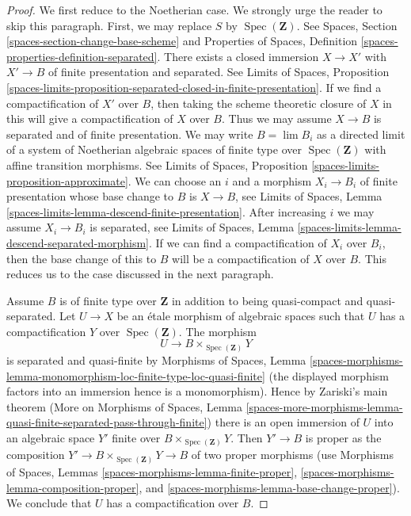 \documentclass{stacks-project}
\theoremstyle{plain}
\theoremstyle{definition}
\theoremstyle{remark}
\numberwithin{equation}{subsection}
\def\lim{\mathop{\mathrm{lim}}\nolimits}
\def\Spec{\mathop{\mathrm{Spec}}}
\begin{document}
\begin{proof}
We first reduce to the Noetherian case. We strongly urge the reader
to skip this paragraph. First, we may replace $S$ by $\Spec(\mathbf{Z})$.
See Spaces, Section \ref{spaces-section-change-base-scheme} and
Properties of Spaces, Definition \ref{spaces-properties-definition-separated}.
There exists a closed immersion
$X \to X'$ with $X' \to B$ of finite presentation and separated.
See Limits of Spaces, Proposition
\ref{spaces-limits-proposition-separated-closed-in-finite-presentation}.
If we find a compactification of $X'$ over $B$, then
taking the scheme theoretic closure of $X$ in this will give
a compactification of $X$ over $B$. Thus we may assume
$X \to B$ is separated and of finite presentation.
We may write $B = \lim B_i$ as a directed
limit of a system of Noetherian algebraic spaces
of finite type over $\Spec(\mathbf{Z})$
with affine transition morphisms.
See Limits of Spaces, Proposition \ref{spaces-limits-proposition-approximate}.
We can choose an $i$ and a morphism $X_i \to B_i$ of finite
presentation whose base change to $B$ is $X \to B$, see
Limits of Spaces, Lemma \ref{spaces-limits-lemma-descend-finite-presentation}.
After increasing $i$ we may assume $X_i \to B_i$ is separated, see
Limits of Spaces, Lemma
\ref{spaces-limits-lemma-descend-separated-morphism}.
If we can find a compactification of $X_i$ over $B_i$, then the
base change of this to $B$ will be a compactification of $X$ over $B$.
This reduces us to the case discussed in the next paragraph.

\medskip\noindent
Assume $B$ is of finite type over $\mathbf{Z}$ in addition to being
quasi-compact and quasi-separated. Let $U \to X$ be an \'etale
morphism of algebraic spaces such that $U$ has a compactification
$Y$ over $\Spec(\mathbf{Z})$. The morphism
$$
U \longrightarrow B \times_{\Spec(\mathbf{Z})} Y
$$
is separated and quasi-finite by Morphisms of Spaces, Lemma
\ref{spaces-morphisms-lemma-monomorphism-loc-finite-type-loc-quasi-finite}
(the displayed morphism factors into an immersion hence is a monomorphism).
Hence by Zariski's main theorem (More on Morphisms of Spaces, Lemma
\ref{spaces-more-morphisms-lemma-quasi-finite-separated-pass-through-finite})
there is an open immersion of $U$ into an algebraic space $Y'$
finite over $B \times_{\Spec(\mathbf{Z})} Y$. Then $Y' \to B$ is proper
as the composition $Y' \to B \times_{\Spec(\mathbf{Z})} Y \to B$
of two proper morphisms
(use Morphisms of Spaces, Lemmas \ref{spaces-morphisms-lemma-finite-proper},
\ref{spaces-morphisms-lemma-composition-proper}, and
\ref{spaces-morphisms-lemma-base-change-proper}).
We conclude that $U$ has a compactification over $B$.


\end{proof}
\end{document}
